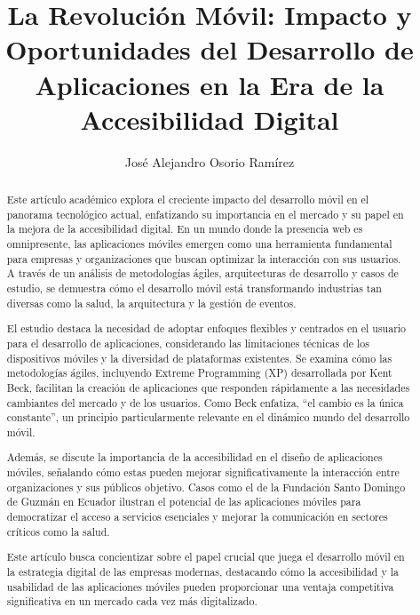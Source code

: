 \documentclass[12pt]{article}
\title{La Revolución Móvil: Impacto y Oportunidades del Desarrollo de Aplicaciones en la Era de la Accesibilidad Digital}
\author{José Alejandro Osorio Ramírez}
\date{}
\begin{document}
\maketitle

\begin{abstract}
Este artículo académico explora el creciente impacto del desarrollo móvil en el panorama tecnológico actual, enfatizando su importancia en el mercado y su papel en la mejora de la accesibilidad digital. En un mundo donde la presencia web es omnipresente, las aplicaciones móviles emergen como una herramienta fundamental para empresas y organizaciones que buscan optimizar la interacción con sus usuarios. A través de un análisis de metodologías ágiles, arquitecturas de desarrollo y casos de estudio, se demuestra cómo el desarrollo móvil está transformando industrias tan diversas como la salud, la arquitectura y la gestión de eventos.

El estudio destaca la necesidad de adoptar enfoques flexibles y centrados en el usuario para el desarrollo de aplicaciones, considerando las limitaciones técnicas de los dispositivos móviles y la diversidad de plataformas existentes. Se examina cómo las metodologías ágiles, incluyendo Extreme Programming (XP) desarrollada por Kent Beck, facilitan la creación de aplicaciones que responden rápidamente a las necesidades cambiantes del mercado y de los usuarios. Como Beck enfatiza, \enquote{el cambio es la única constante}, un principio particularmente relevante en el dinámico mundo del desarrollo móvil.

Además, se discute la importancia de la accesibilidad en el diseño de aplicaciones móviles, señalando cómo estas pueden mejorar significativamente la interacción entre organizaciones y sus públicos objetivo. Casos como el de la Fundación Santo Domingo de Guzmán en Ecuador ilustran el potencial de las aplicaciones móviles para democratizar el acceso a servicios esenciales y mejorar la comunicación en sectores críticos como la salud.

Este artículo busca concientizar sobre el papel crucial que juega el desarrollo móvil en la estrategia digital de las empresas modernas, destacando cómo la accesibilidad y la usabilidad de las aplicaciones móviles pueden proporcionar una ventaja competitiva significativa en un mercado cada vez más digitalizado.
\end{abstract}
\end{document}
